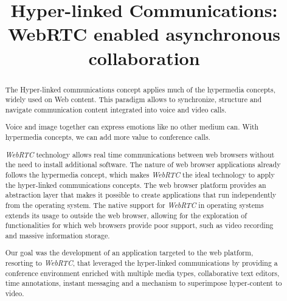 \documentclass[conference,compsoc,a4paper]{IEEEtran}
\begin{document}
\title{Hyper-linked Communications: WebRTC enabled asynchronous collaboration}

\author{
\and
{}
}

\maketitle

\begin{abstract}
The Hyper-linked communications concept applies much of the hypermedia concepts, widely used on Web content. This paradigm allows to synchronize, structure and navigate communication content integrated into voice and video calls.

Voice and image together can express emotions like no other medium can. With hypermedia concepts, we can add more value to conference calls.

\emph{WebRTC} technology allows real time communications between web browsers without the need to install additional software. The nature of web browser applications already follows the hypermedia concept, which makes \emph{WebRTC} the ideal technology to apply the hyper-linked communications concepts.
The web browser platform provides an abstraction layer that makes it possible to create applications that run independently from the operating system.
The native support for \emph{WebRTC} in operating systems extends its usage to outside the web browser, allowing for the exploration of functionalities for which web browsers provide poor support, such as video recording and massive information storage.

Our goal was the development of an application targeted to the web platform, resorting to \emph{WebRTC}, that leveraged the hyper-linked communications by providing a conference environment enriched with multiple media types, collaborative text editors, time annotations, instant messaging and a mechanism to superimpose hyper-content to video.
\end{abstract}
\end{document}
